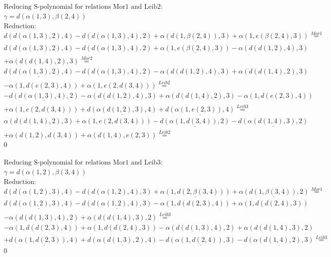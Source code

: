 \documentclass[11pt]{amsart}
\begin{document}
\begin{align*} 
& \text{Reducing S-polynomial for relations Mor1 and Leib2:} \\ 
& \gamma = d(\alpha(1,3),\beta(2,4)) \\ 
& \text{Reduction}: \\&d(d(\alpha(1,3),2),4) - d(d(\alpha(1,3),4),2) + \underline{\alpha(d(1,\beta(2,4)),3)} + \alpha(1,e(\beta(2,4),3)) \stackrel{ Mor1 }{=}  \\ 
&d(d(\alpha(1,3),2),4) - d(d(\alpha(1,3),4),2) + \underline{\alpha(1,e(\beta(2,4),3))} - \alpha(d(d(1,2),4),3)\\ 
 &  + \alpha(d(d(1,4),2),3) \stackrel{ Mor2 }{=}  \\ 
&\underline{d(d(\alpha(1,3),2),4)} - d(d(\alpha(1,3),4),2) - \alpha(d(d(1,2),4),3) + \alpha(d(d(1,4),2),3)\\ 
 &  - \alpha(1,d(e(2,3),4)) + \alpha(1,e(2,d(3,4))) \stackrel{ Leib2 }{=}  \\ 
& - \underline{d(d(\alpha(1,3),4),2)} - \alpha(d(d(1,2),4),3) + \alpha(d(d(1,4),2),3) - \alpha(1,d(e(2,3),4))\\ 
 &  + \alpha(1,e(2,d(3,4))) + \underline{d(\alpha(d(1,2),3),4)} + \underline{d(\alpha(1,e(2,3)),4)} \stackrel{ Leib3 }{=}  \\ 
&\alpha(d(d(1,4),2),3) + \alpha(1,e(2,d(3,4))) - \underline{d(\alpha(1,d(3,4)),2)} - \underline{d(\alpha(d(1,4),3),2)}\\ 
 &  + \alpha(d(1,2),d(3,4)) + \alpha(d(1,4),e(2,3)) \stackrel{ Leib2 }{=}  \\ 
&0\\ 
\end{align*} 
 
\begin{align*} 
& \text{Reducing S-polynomial for relations Mor1 and Leib3:} \\ 
& \gamma = d(\alpha(1,2),\beta(3,4)) \\ 
& \text{Reduction}: \\&d(d(\alpha(1,2),3),4) - d(d(\alpha(1,2),4),3) + \underline{\alpha(1,d(2,\beta(3,4)))} + \underline{\alpha(d(1,\beta(3,4)),2)} \stackrel{ Mor1 }{=}  \\ 
&\underline{d(d(\alpha(1,2),3),4)} - \underline{d(d(\alpha(1,2),4),3)} - \alpha(1,d(d(2,3),4)) + \alpha(1,d(d(2,4),3))\\ 
 &  - \alpha(d(d(1,3),4),2) + \alpha(d(d(1,4),3),2) \stackrel{ Leib3 }{=}  \\ 
& - \alpha(1,d(d(2,3),4)) + \alpha(1,d(d(2,4),3)) - \alpha(d(d(1,3),4),2) + \alpha(d(d(1,4),3),2)\\ 
 &  + \underline{d(\alpha(1,d(2,3)),4)} + \underline{d(\alpha(d(1,3),2),4)} - \underline{d(\alpha(1,d(2,4)),3)} - \underline{d(\alpha(d(1,4),2),3)} \stackrel{ Leib3 }{=}  \\ 
&0\\ 
\end{align*} 
 
\end{document}
